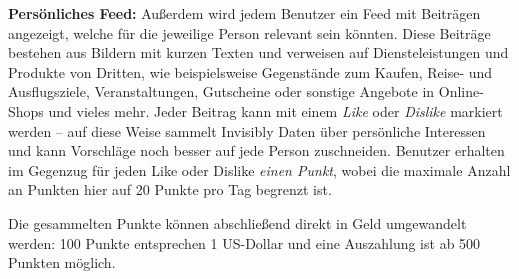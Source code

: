 \noindent \textbf{Persönliches Feed:} Außerdem wird jedem Benutzer ein Feed mit Beiträgen angezeigt, welche für die jeweilige Person relevant sein könnten. Diese Beiträge bestehen aus Bildern mit kurzen Texten und verweisen auf Diensteleistungen und Produkte von Dritten, wie beispielsweise Gegenstände zum Kaufen, Reise- und Ausflugsziele, Veranstaltungen, Gutscheine oder sonstige Angebote in Online-Shops und vieles mehr. Jeder Beitrag kann mit einem \textit{Like} oder \textit{Dislike} markiert werden -- auf diese Weise sammelt Invisibly Daten über persönliche Interessen und kann Vorschläge noch besser auf jede Person zuschneiden. Benutzer erhalten im Gegenzug für jeden Like oder Dislike \textit{einen Punkt}, wobei die maximale Anzahl an Punkten hier auf 20 Punkte pro Tag begrenzt ist. \cite{invisiblyWhyPay_2021} \newline

\noindent Die gesammelten Punkte können abschließend direkt in Geld umgewandelt werden: 100 Punkte entsprechen 1 US-Dollar und eine Auszahlung ist ab 500 Punkten möglich. \cite{invisiblyWhyPay_2021}